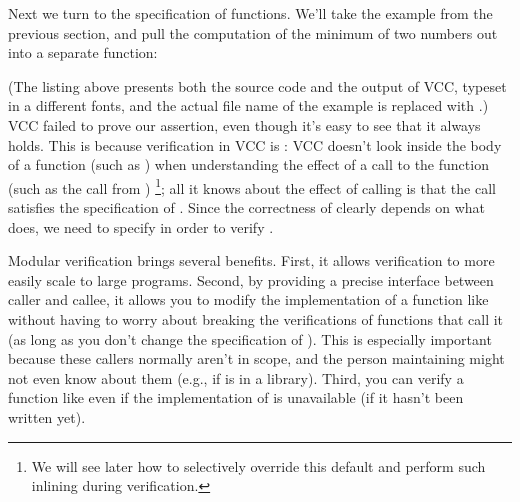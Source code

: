 Next we turn to the specification of functions. We'll take the example
from the previous section, and pull the computation of the minimum of
two numbers out into a separate function:


(The listing above presents both the source code and the output
of VCC, typeset in a different fonts, and 
the actual file name of the example is replaced with .)
VCC failed to prove our assertion, even though it's easy to see that
it always holds. This is because verification in VCC is : 
VCC doesn't look inside the body of a function (such as ) 
when understanding the effect of a call to the function (such as 
the call from )%
\footnote{We will see later how to selectively override this default
  and perform such inlining during verification.}; 
all it knows about the effect of calling  is that the call 
satisfies the specification of . 
Since the correctness of  clearly depends on what 
does, we need to specify  in order to verify .

Modular verification brings several benefits. 
First, it allows verification to more easily scale to
large programs. Second, by providing a precise interface between
caller and callee, it allows you to modify the implementation of
a function like  without having to worry about breaking the
verifications of functions that call it (as long as you don't change
the specification of ). This is especially important
because these callers normally aren't in scope, and the person
maintaining  might not even know about them (e.g., if
 is in a library). Third, you can verify a function like
 even if the implementation of  is unavailable
(\eg if it hasn't been written yet). 

